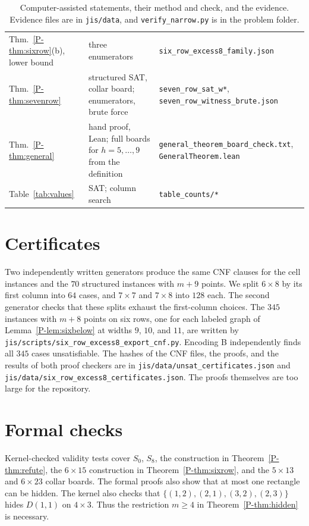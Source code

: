 \documentclass[12pt]{article}
\theoremstyle{plain}
\begin{document}
\begin{table}[H]
\begin{tabular}{@{}>{\raggedright\arraybackslash}p{}>{\raggedright\arraybackslash}p{}>{\raggedright\arraybackslash}p{}@{}}
Thm.~\ref{P-thm:sixrow}(b), lower bound & three enumerators & \nolinkurl{six_row_excess8_family.json} \\
Thm.~\ref{P-thm:sevenrow} & structured SAT, collar board; enumerators, brute force & \nolinkurl{seven_row_sat_w*}, \nolinkurl{seven_row_witness_brute.json} \\
Thm.~\ref{P-thm:general} & hand proof, Lean; full boards for $h=5,\dots,9$ from the definition & \nolinkurl{general_theorem_board_check.txt}, \nolinkurl{GeneralTheorem.lean} \\
Table~\ref{tab:values} & SAT; column search & \nolinkurl{table_counts/*} \\
\bottomrule
\end{tabular}
\caption{Computer-assisted statements, their method and check, and the evidence. Evidence
files are in \nolinkurl{jis/data}, and \nolinkurl{verify_narrow.py} is in the problem folder.}
\label{tab:evidence}
\end{table}

\section{Certificates}

Two independently written generators produce the same CNF clauses for the cell
instances and the $70$ structured instances with $m+9$ points. We split $6\times8$ by its first column into $64$ cases,
and $7\times7$ and $7\times8$ into $128$ each. The second generator checks that these splits
exhaust the first-column choices. The $345$ instances with $m+8$ points on six rows, one for
each labeled graph of Lemma~\ref{P-lem:sixbelow} at widths $9$, $10$, and $11$, are written
by \nolinkurl{jis/scripts/six_row_excess8_export_cnf.py}. Encoding B independently finds all $345$ cases unsatisfiable. The hashes of the CNF files, the
proofs, and the results of both proof checkers are in
\nolinkurl{jis/data/unsat_certificates.json} and
\nolinkurl{jis/data/six_row_excess8_certificates.json}. The proofs themselves are too large
for the repository.

\section{Formal checks}

Kernel-checked validity tests cover $S_0$, $S_8$, the construction
in Theorem~\ref{P-thm:refute}, the $6\times15$ construction in
Theorem~\ref{P-thm:sixrow}, and the $5\times13$ and $6\times23$ collar
boards. The formal proofs also show that at most one rectangle can be hidden.
The kernel also checks that
$\{(1,2),(2,1),(3,2),(2,3)\}$ hides
$D(1,1)$ on $4\times3$. Thus the restriction $m\ge4$ in
Theorem~\ref{P-thm:hidden} is necessary.
\end{document}
